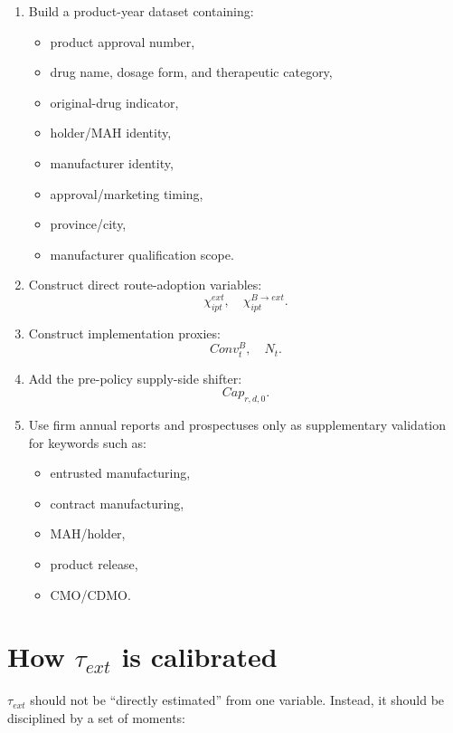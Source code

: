 \documentclass[12pt]{article}
\begin{document}
\begin{enumerate}[leftmargin=2em]
    \item Build a product-year dataset containing:
    \begin{itemize}[leftmargin=2em]
        \item product approval number,
        \item drug name, dosage form, and therapeutic category,
        \item original-drug indicator,
        \item holder/MAH identity,
        \item manufacturer identity,
        \item approval/marketing timing,
        \item province/city,
        \item manufacturer qualification scope.
    \end{itemize}

    \item Construct direct route-adoption variables:
    \[
    \chi^{ext}_{ipt}, \quad \chi^{B\to ext}_{ipt}.
    \]

    \item Construct implementation proxies:
    \[
    Conv^B_t, \quad N_t.
    \]

    \item Add the pre-policy supply-side shifter:
    \[
    Cap_{r,d,0}.
    \]

    \item Use firm annual reports and prospectuses only as supplementary validation for
    keywords such as:
    \begin{itemize}[leftmargin=2em]
        \item entrusted manufacturing,
        \item contract manufacturing,
        \item MAH/holder,
        \item product release,
        \item CMO/CDMO.
    \end{itemize}
\end{enumerate}

\section{How \texorpdfstring{$\tau_{ext}$}{tau\_ext} is calibrated}

\(\tau_{ext}\) should not be ``directly estimated'' from one variable.
Instead, it should be disciplined by a set of moments:
\end{document}

